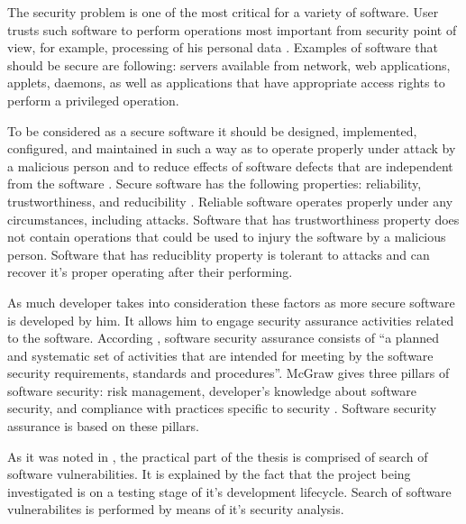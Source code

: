 %
The security problem is one of the most critical for a variety of software. 
%
User trusts such software to perform operations most important from security point of view, for example, processing of his personal data . 
%
Examples of software that should be secure are following: servers available from network, web applications, applets, daemons, as well as applications that have appropriate access rights to perform a privileged operation. 

%
To be considered as a secure software it should be designed, implemented, configured, and maintained in such a way as to operate properly under attack by a malicious person and to reduce effects of software defects that are independent from the software . 
%
Secure software has the following properties: reliability, trustworthiness, and reducibility . 
%
Reliable software operates properly under any circumstances, including attacks. 
%
Software that has trustworthiness property does not contain operations that could be used to injury the software by a malicious person. 
%
Software that has reduciblity property is tolerant to attacks and can recover it's proper operating after their performing. 

%
As much developer takes into consideration these factors as more secure software is developed by him. 
%
It allows him to engage security assurance activities related to the software. 
%
According , software security assurance consists of ``a planned and systematic set of activities that are intended for meeting by the software security requirements, standards and procedures''. 
%
McGraw gives three pillars of software security: risk management, developer's knowledge about software security, and compliance with practices specific to security .
%
Software security assurance is based on these pillars. 

%
As it was noted in , the practical part of the thesis is comprised of search of software vulnerabilities. 
%
It is explained by the fact that the project being investigated is on a testing stage of it's development lifecycle. 
%
Search of software vulnerabilites is performed by means of it's security analysis. 